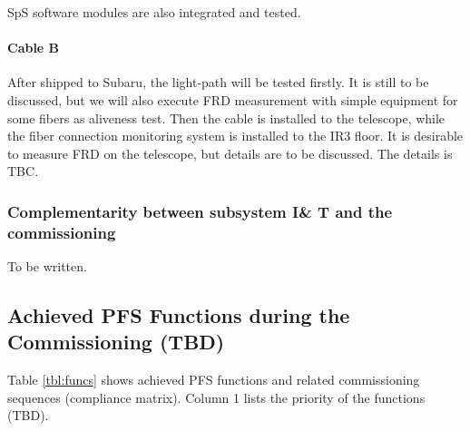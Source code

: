 SpS software modules are also integrated and tested.

\paragraph{Cable B}
After shipped to Subaru, the light-path will be tested firstly. 
It is still to be discussed, but we will also execute FRD measurement with simple equipment for some fibers as aliveness test.
Then the cable is installed to the telescope, while the fiber connection monitoring system is installed to the IR3 floor.
It is desirable to measure FRD on the telescope, but details are to be discussed.
The details is TBC.


\subsubsection{Complementarity between subsystem I\& T and the commissioning}
To be written.







\subsection{Achieved PFS Functions during the Commissioning (TBD)}\label{sec:cmatrix}
Table \ref{tbl:funcs} shows achieved PFS functions and related commissioning sequences (compliance matrix).
Column 1 lists the priority of the functions (TBD).



